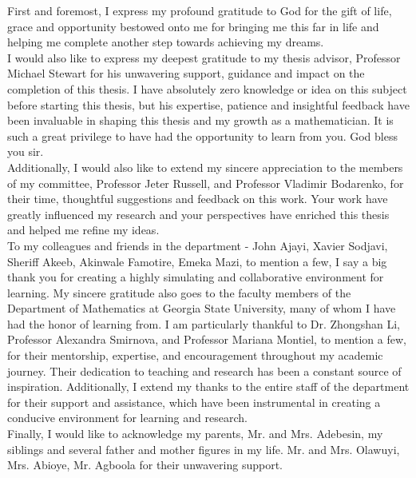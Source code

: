 First and foremost, I express my profound gratitude to God for the gift of life, grace and opportunity bestowed onto me for bringing me this far in life and helping me complete another step towards achieving my dreams.\\[5pt]
I would also like to express my deepest gratitude to my thesis advisor, Professor Michael Stewart for his unwavering support, guidance and impact on the completion of this thesis. I have absolutely zero knowledge or idea on this subject before starting this thesis, but his expertise, patience and insightful feedback have been invaluable in shaping this thesis and my growth as a mathematician. It is such a great privilege to have had the opportunity to learn from you. God bless you sir.\\[5pt]
Additionally, I would also like to extend my sincere appreciation to the members of my committee, Professor Jeter Russell, and Professor Vladimir Bodarenko, for their time, thoughtful suggestions and feedback on this work. Your work have greatly influenced my research and your perspectives have enriched this thesis and helped me refine my ideas.\\[5pt]
To my colleagues and friends in the department - John Ajayi, Xavier Sodjavi, Sheriff Akeeb, Akinwale Famotire, Emeka Mazi, to mention a few, I say a big thank you for creating a highly simulating and collaborative environment for learning. My sincere gratitude also goes to the faculty members of the Department of Mathematics at Georgia State University, many of whom I have had the honor of learning from. I am particularly thankful to Dr. Zhongshan Li, Professor Alexandra Smirnova, and Professor Mariana Montiel, to mention a few, for their mentorship, expertise, and encouragement throughout my academic journey. Their dedication to teaching and research has been a constant source of inspiration. Additionally, I extend my thanks to the entire staff of the department for their support and assistance, which have been instrumental in creating a conducive environment for learning and research.\\[5pt]
Finally, I would like to acknowledge my parents, Mr. and Mrs. Adebesin, my siblings and several father and mother figures in my life. Mr. and Mrs. Olawuyi, Mrs. Abioye, Mr. Agboola for their unwavering support. 